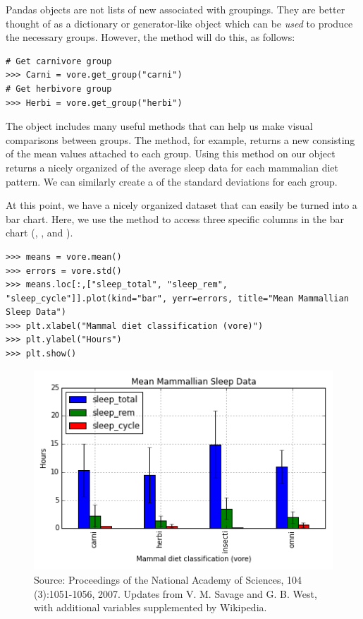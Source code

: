 Pandas  objects are not lists of new  associated with groupings.
They are better thought of as a dictionary or generator-like object which can be \emph{used} to produce the necessary groups.
However, the  method will do this, as follows:

\begin{lstlisting}
# Get carnivore group
>>> Carni = vore.get_group("carni")
# Get herbivore group
>>> Herbi = vore.get_group("herbi")
\end{lstlisting}

The  object includes many useful methods that can help us make visual comparisons between groups. 
The  method, for example, returns a new  consisting of the mean values attached to each group.
Using this method on our  object returns a nicely organized  of the average sleep data for each mammalian diet pattern.
We can similarly create a  of the standard deviations for each group.

At this point, we have a nicely organized dataset that can easily be turned into a bar chart.
Here, we use the  method to access three specific columns in the bar chart (, , and ).
\begin{lstlisting}
>>> means = vore.mean()
>>> errors = vore.std()
>>> means.loc[:,["sleep_total", "sleep_rem", "sleep_cycle"]].plot(kind="bar", yerr=errors, title="Mean Mammallian Sleep Data")
>>> plt.xlabel("Mammal diet classification (vore)")
>>> plt.ylabel("Hours")
>>> plt.show()
\end{lstlisting}

\begin{figure}[H] 
    \centering
    \includegraphics[width=.75\textwidth]{MeanMammal.png}
    \caption{Source:  Proceedings of the National Academy of Sciences, 104 (3):1051-1056, 2007. Updates from V. M. Savage and G. B. West, with additional variables supplemented by Wikipedia.}
    \label{fig:barplot}
\end{figure}

